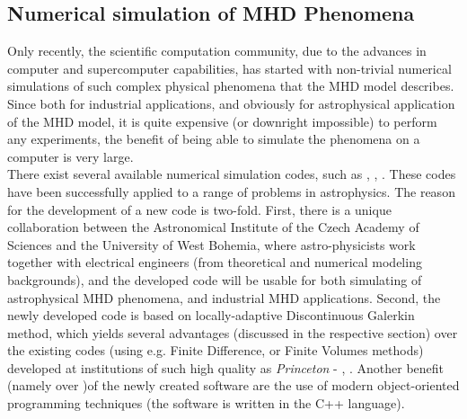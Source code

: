 \subsection{Numerical simulation of MHD Phenomena}
Only recently, the scientific computation community, due to the advances in computer and supercomputer capabilities, has started with non-trivial numerical simulations of such complex physical phenomena that the MHD model describes. Since both for industrial applications, and obviously for astrophysical application of the MHD model, it is quite expensive (or downright impossible) to perform any experiments, the benefit of being able to simulate the phenomena on a computer is very large.\\
There exist several available numerical simulation codes, such as \cite{athena}, \cite{zeus}, \cite{ramses}. These codes have been successfully applied to a range of problems in astrophysics. The reason for the development of a new code is two-fold. First, there is a unique collaboration between the Astronomical Institute of the Czech Academy of Sciences and the University of West Bohemia, where astro-physicists work together with electrical engineers (from theoretical and numerical modeling backgrounds), and the developed code will be usable for both simulating of astrophysical MHD phenomena, and industrial MHD applications. Second, the newly developed code is based on locally-adaptive Discontinuous Galerkin method, which yields several advantages (discussed in the respective section) over the existing codes (using e.g. Finite Difference, or Finite Volumes methods) developed at institutions of such high quality as \emph{Princeton} - \cite{athena}, \cite{zeus}. Another benefit (namely over \cite{zeus})of the newly created software are the use of modern object-oriented programming techniques (the software is written in the C++ language).